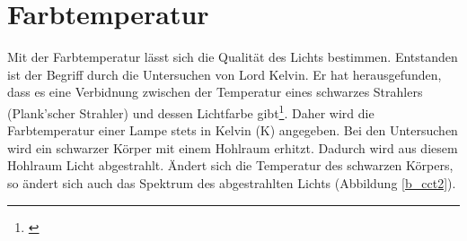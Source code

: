


\section{Farbtemperatur} \label{sec_farbtemperatur}
Mit der Farbtemperatur lässt sich die Qualität des Lichts 
bestimmen. Entstanden ist der Begriff durch die Untersuchen von Lord Kelvin. Er hat herausgefunden, dass es eine Verbidnung zwischen der Temperatur eines schwarzes Strahlers (Plank'scher Strahler) und dessen Lichtfarbe gibt\footnote{\cite[89]{mueller}}. Daher wird die Farbtemperatur einer Lampe stets in Kelvin (K) angegeben. Bei den Untersuchen wird ein schwarzer Körper mit einem Hohlraum erhitzt. Dadurch wird aus diesem Hohlraum Licht abgestrahlt. Ändert sich die Temperatur des schwarzen Körpers, so ändert sich auch das Spektrum des abgestrahlten Lichts (Abbildung \ref{b_cct2}).

